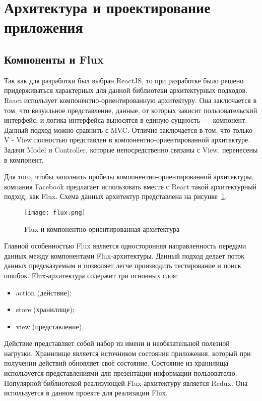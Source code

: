 \section{Архитектура и проектирование приложения}
\label{sec:arch_and_mod}
 
\subsection{Компоненты и Flux}
Так как для разработки был выбран ReactJS, то при разработке было решено придерживаться характерных для данной библиотеки архитектурных подходов.
React использует компонентно-ориентированную архитектуру. 
Она заключается в том, что визуальное представление, данные, от которых зависит пользовательский интерфейс, и логика интерфейса выносятся в единую сущность~--- компонент. 
Данный подход можно сравнить с MVC. 
Отличие заключается в том, что только V - View полностью представлен в компонентно-ориентированной архитектуре.
Задачи Model и Controller, которые непосредственно связаны с View, перенесены в компонент.
 
Для того, чтобы заполнить пробелы компонентно-ориентированной архитектуры, компания Facebook предлагает использовать вместе с React такой архитектурный подход, как Flux. 
Схема данных архитектур представлена на рисунке~\ref{fig:arch:flux}.
 
\begin{figure}[H]
 \centering
   \texttt{[image: flux.png]} 
   \caption{Flux и компонентно-ориентированная архитектура}
   \label{fig:arch:flux}
\end{figure}
 
Главной особенностью Flux является односторонняя направленность передачи данных между компонентами Flux-архитектуры. 
Данный подход делает поток данных предсказуемым и позволяет легче производить тестирование и поиск ошибок. 
Flux-архитектура содержит три основных слоя:
\begin{itemize}
 \item action (действие);
 \item store (хранилище);
 \item view (представление).
\end{itemize}
 
Действие представляет собой набор из имени и необязательной полезной нагрузки. 
Хранилище является источником состояния приложения, который при получении действий обновляет своё состояние. 
Состояние из хранилища используется представлениями для презентации информации пользователю. 
Популярной библиотекой реализующей Flux-архитектуру является Redux\cite{redux}. 
Она используется в данном проекте для реализации Flux.
 
